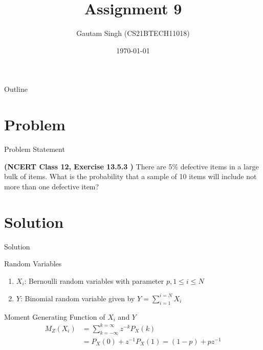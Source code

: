 \documentclass{beamer}
\title{Assignment 9}
\author{Gautam Singh (CS21BTECH11018)}
\date{\today}
\begin{document}
\begin{frame}
    \titlepage 
\end{frame}

\logo{}


\begin{frame}{Outline}
    \tableofcontents
\end{frame}


\section{Problem}
\begin{frame}{Problem Statement}

\textbf{(NCERT Class 12, Exercise 13.5.3 )} There are 5\% defective items in a large bulk of items. What is the probability that a sample of 10 items will include not more than one defective item?

\end{frame}


\section{Solution}
\begin{frame}{Solution}
    \begin{block}{Random Variables}
        \begin{enumerate}
        		\item $X_i$: Bernoulli random variables with parameter $p, 1 \leq i \leq N$
        		\item $Y$: Binomial random variable given by $Y = \sum_{i = 1}^{i = N}X_i$
        \end{enumerate}
    \end{block}
    \begin{exampleblock}{Moment Generating Function of $X_i$ and $Y$}
		\begin{align}
			M_Z(X_i) &= \sum_{k = -\infty}^{k = \infty}z^{-k}P_X(k) \\
			&= P_X(0) + z^{-1}P_X(1) = (1 - p) + pz^{-1} \\
			\label{mgf-X}
		\end{align}
    \end{exampleblock}
\end{frame} 
\end{document}
